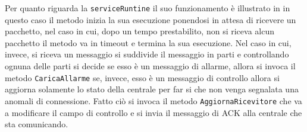 Per quanto riguarda la \texttt{serviceRuntine} il suo funzionamento è illustrato in  in questo caso il metodo inizia la sua esecuzione ponendosi in attesa di ricevere un pacchetto, nel caso in cui, dopo un tempo prestabilito, non si riceva alcun pacchetto il metodo va in timeout e termina la sua esecuzione.
Nel caso in cui, invece, si riceva un messaggio si suddivide il messaggio in parti e controllando ognuna delle parti si decide se esso è un messaggio di allarme, allora si invoca il metodo \texttt{CaricaAllarme} se, invece, esso è un messaggio di controllo allora si aggiorna solamente lo stato della centrale per far si che non venga segnalata una anomali di connessione. Fatto ciò si invoca il metodo \texttt{AggiornaRicevitore} che va a modificare il campo di controllo e si invia il messaggio di ACK alla centrale che sta comunicando.
